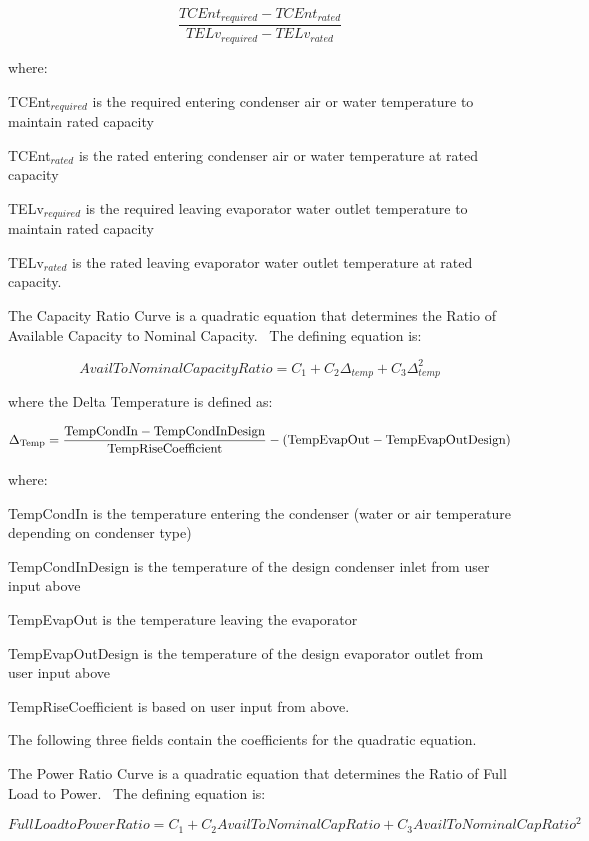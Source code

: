 \begin{equation}
\frac{{TCEn{t_{required}} - TCEn{t_{rated}}}}{{TEL{v_{required}} - TEL{v_{rated}}}}
\end{equation}

where:

TCEnt\(_{required}\) is the required entering condenser air or water temperature to maintain rated capacity

TCEnt\(_{rated}\) is the rated entering condenser air or water temperature at rated capacity

TELv\(_{required}\) is the required leaving evaporator water outlet temperature to maintain rated capacity

TELv\(_{rated}\) is the rated leaving evaporator water outlet temperature at rated capacity.

The Capacity Ratio Curve is a quadratic equation that determines the Ratio of Available Capacity to Nominal Capacity.~ The defining equation is:

\begin{equation}
AvailToNominalCapacityRatio = {C_1} + {C_2}{\Delta_{temp}} + {C_3}\Delta_{temp}^2
\end{equation}

where the Delta Temperature is defined as:

\begin{equation}
{\Delta_{{\rm{Temp}}}} = \frac{{{\rm{TempCondIn  -  TempCondInDesign }}}}{{{\rm{TempRiseCoefficient}}}} - ({\rm{TempEvapOut  -  TempEvapOutDesign)}}
\end{equation}

where:

TempCondIn is the temperature entering the condenser (water or air temperature depending on condenser type)

TempCondInDesign is the temperature of the design condenser inlet from user input above

TempEvapOut is the temperature leaving the evaporator

TempEvapOutDesign is the temperature of the design evaporator outlet from user input above

TempRiseCoefficient is based on user input from above.

The following three fields contain the coefficients for the quadratic equation.

The Power Ratio Curve is a quadratic equation that determines the Ratio of Full Load to Power.~ The defining equation is:

\begin{equation}
FullLoadtoPowerRatio = {C_1} + {C_2}AvailToNominalCapRatio + {C_3}AvailToNominalCapRati{o^2}
\end{equation}

